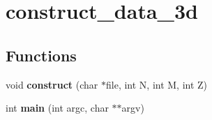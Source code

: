 \hypertarget{group__applications__mri3d__construct__data__3d}{
\section{construct\_\-data\_\-3d}
\label{group__applications__mri3d__construct__data__3d}
}
\subsection*{Functions}
\begin{CompactItemize}
\item 
\hypertarget{group__applications__mri3d__construct__data__3d_ga0}{
void {\bf construct} (char $\ast$file, int N, int M, int Z)}
\label{group__applications__mri3d__construct__data__3d_ga0}

\item 
\hypertarget{group__applications__mri3d__construct__data__3d_ga1}{
int {\bf main} (int argc, char $\ast$$\ast$argv)}
\label{group__applications__mri3d__construct__data__3d_ga1}

\end{CompactItemize}

